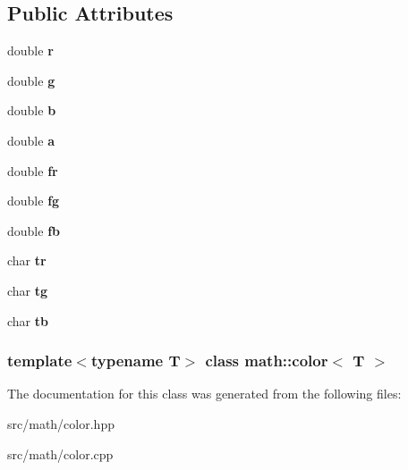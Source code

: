 \subsection*{Public Attributes}
\begin{DoxyCompactItemize}
\item 
\hypertarget{classmath_1_1color_a70b4e3b2076ac575c9f0fd5675df96b9}{
double {\bfseries r}}
\label{classmath_1_1color_a70b4e3b2076ac575c9f0fd5675df96b9}

\item 
\hypertarget{classmath_1_1color_afd24432aa0fdaa21f16a5c0aaa4f7c15}{
double {\bfseries g}}
\label{classmath_1_1color_afd24432aa0fdaa21f16a5c0aaa4f7c15}

\item 
\hypertarget{classmath_1_1color_a91409724fd16c499eafeaa054359b36e}{
double {\bfseries b}}
\label{classmath_1_1color_a91409724fd16c499eafeaa054359b36e}

\item 
\hypertarget{classmath_1_1color_af9641bfedd24fdca127a048cc07c095b}{
double {\bfseries a}}
\label{classmath_1_1color_af9641bfedd24fdca127a048cc07c095b}

\item 
\hypertarget{classmath_1_1color_a57917be0bfc64fce649bf6b500cc9daf}{
double {\bfseries fr}}
\label{classmath_1_1color_a57917be0bfc64fce649bf6b500cc9daf}

\item 
\hypertarget{classmath_1_1color_af0496bb10fbf9ecf6975609189528877}{
double {\bfseries fg}}
\label{classmath_1_1color_af0496bb10fbf9ecf6975609189528877}

\item 
\hypertarget{classmath_1_1color_aa1e2544e4da80521af6d5793273efda0}{
double {\bfseries fb}}
\label{classmath_1_1color_aa1e2544e4da80521af6d5793273efda0}

\item 
\hypertarget{classmath_1_1color_ad3e7415b7e4abeb8e896891cd9c138f6}{
char {\bfseries tr}}
\label{classmath_1_1color_ad3e7415b7e4abeb8e896891cd9c138f6}

\item 
\hypertarget{classmath_1_1color_a1246dfe8c8411d820a6d431cce8c7ca9}{
char {\bfseries tg}}
\label{classmath_1_1color_a1246dfe8c8411d820a6d431cce8c7ca9}

\item 
\hypertarget{classmath_1_1color_a093ac45e767fa6a162b46100a56ed71c}{
char {\bfseries tb}}
\label{classmath_1_1color_a093ac45e767fa6a162b46100a56ed71c}

\end{DoxyCompactItemize}
\subsubsection*{template$<$typename T$>$ class math::color$<$ T $>$}



The documentation for this class was generated from the following files:\begin{DoxyCompactItemize}
\item 
src/math/color.hpp\item 
src/math/color.cpp\end{DoxyCompactItemize}
